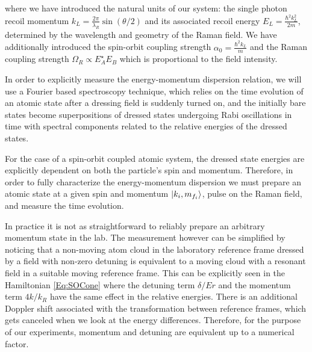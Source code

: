where we have introduced the natural units of our system: the single photon recoil momentum $k_L=\frac{2\pi}{\lambda_R}\sin(\theta/2)$ and its associated recoil energy $E_L=\frac{\hbar^2k_L^2}{2m}$, determined by the wavelength and geometry of the Raman field. We have additionally introduced the spin-orbit coupling strength $\alpha_0=\frac{\hbar^2k_L}{m}$ and the Raman coupling strength $\Omega_R\propto E_A^{\star}E_B$ which is proportional to the field intensity. 


In order to explicitly measure the  energy-momentum dispersion relation, we will use a Fourier based spectroscopy technique, which relies on the time evolution of an atomic state after a dressing field is suddenly turned on, and the initially bare states become superpositions of dressed states undergoing Rabi oscillations in time  with spectral components related to the relative energies of the dressed states. 



For the case of a spin-orbit coupled atomic system, the dressed state energies are explicitly dependent on both the particle's spin and momentum. Therefore, in order to fully characterize the energy-momentum dispersion we must prepare an atomic state at a given spin and momentum $|k_i,m_{f_i}\rangle$, pulse on the Raman field, and measure the time evolution.  


In practice it is not as straightforward to reliably prepare an arbitrary momentum state in the lab. The measurement however can be simplified by noticing that a non-moving atom cloud in the laboratory reference frame dressed by a field with non-zero detuning is equivalent to a moving cloud with a resonant field in a suitable moving reference frame. This can be explicitly seen in the Hamiltonian \ref{Eq:SOCone} where the detuning term $\delta/Er$  and the momentum term $4 k/k_R$ have the same effect in the relative energies. There is an additional Doppler shift associated with the transformation between reference frames, which gets canceled when we look at the energy differences. Therefore, for the purpose of our experiments, momentum and detuning are equivalent up to a numerical factor. 


